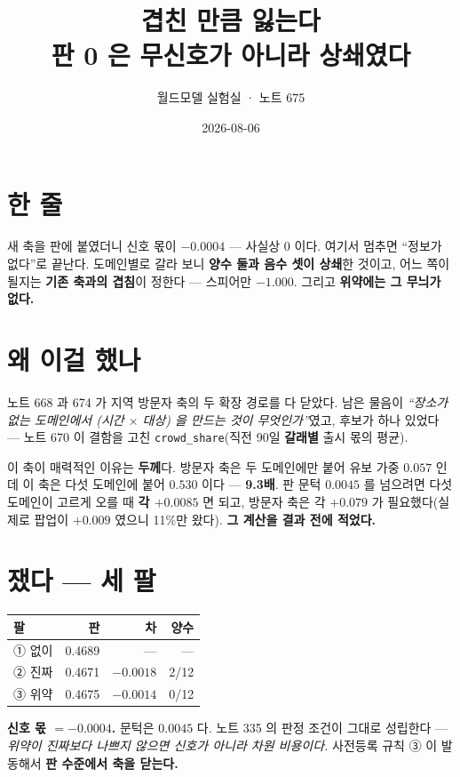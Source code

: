 \documentclass[10pt,a4paper]{article}
\title{\bfseries 겹친 만큼 잃는다\\[2pt]
\large 판 0 은 무신호가 아니라 상쇄였다}
\author{월드모델 실험실 · 노트 675}
\date{2026-08-06}
\begin{document}
\maketitle

\section{한 줄}

새 축을 판에 붙였더니 신호 몫이 $-0.0004$ --- 사실상 0 이다. 여기서 멈추면
``정보가 없다''로 끝난다. 도메인별로 갈라 보니 \textbf{양수 둘과 음수 셋이
상쇄}한 것이고, 어느 쪽이 될지는 \textbf{기존 축과의 겹침}이 정한다 ---
스피어만 $\mathbf{-1.000}$. 그리고 \textbf{위약에는 그 무늬가 없다.}

\section{왜 이걸 했나}

노트 668 과 674 가 지역 방문자 축의 두 확장 경로를 다 닫았다. 남은 물음이
\emph{``장소가 없는 도메인에서 (시간 $\times$ 대상) 을 만드는 것이 무엇인가''}였고,
후보가 하나 있었다 --- 노트 670 이 결함을 고친 \verb|crowd_share|(직전 90일
\textbf{갈래별} 출시 몫의 평균).

이 축이 매력적인 이유는 \textbf{두께}다. 방문자 축은 두 도메인에만 붙어 유보 가중
$0.057$ 인데 이 축은 다섯 도메인에 붙어 \textbf{$0.530$} 이다 --- \textbf{9.3배}.
판 문턱 $0.0045$ 를 넘으려면 다섯 도메인이 고르게 오를 때 \textbf{각
$+0.0085$} 면 되고, 방문자 축은 각 $+0.079$ 가 필요했다(실제로 팝업이 $+0.009$
였으니 11\%만 왔다). \textbf{그 계산을 결과 전에 적었다.}

\section{쟀다 --- 세 팔}

\begin{center}
\begin{tabular}{lrrr}
\toprule
팔 & 판 & 차 & 양수 \\
\midrule
① 없이 & 0.4689 & --- & --- \\
② 진짜 & 0.4671 & $-0.0018$ & 2/12 \\
③ 위약 & 0.4675 & $-0.0014$ & 0/12 \\
\bottomrule
\end{tabular}
\end{center}

\textbf{신호 몫 $= -0.0004$.} 문턱은 $0.0045$ 다. 노트 335 의 판정 조건이 그대로
성립한다 --- \emph{위약이 진짜보다 나쁘지 않으면 신호가 아니라 차원 비용이다.}
사전등록 규칙 ③ 이 발동해서 \textbf{판 수준에서 축을 닫는다.}
\end{document}
